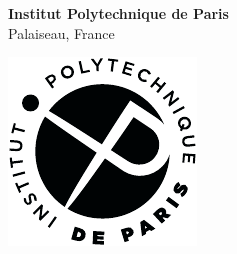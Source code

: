 \hfill
\vfill

\noindent
\begin{minipage}{0.5\linewidth}
  \fontsize{11}{12}\selectfont
  \noindent \textbf{Institut Polytechnique de Paris}\\
   Palaiseau, France 
\end{minipage}
\hfill
\begin{minipage}{22mm}
\includegraphics[width=\linewidth]{graphics/frontmatter/ip-paris-petit.pdf}
\end{minipage}

